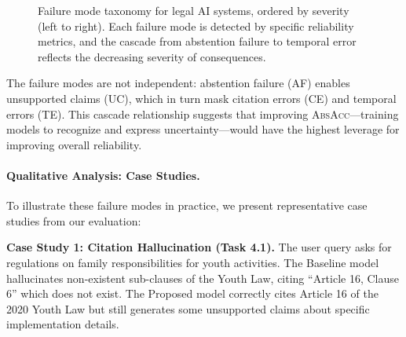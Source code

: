 \documentclass[11pt,a4paper]{article}
\newcommand{\absacc}{\textsc{AbsAcc}}
\begin{document}
\begin{figure}[htbp]
\centering
{}
\caption{Failure mode taxonomy for legal AI systems, ordered by severity (left to right). Each failure mode is detected by specific reliability metrics, and the cascade from abstention failure to temporal error reflects the decreasing severity of consequences.}
\label{fig:failure_modes}
\end{figure}

The failure modes are not independent: abstention failure (AF) enables unsupported claims (UC), which in turn mask citation errors (CE) and temporal errors (TE). This cascade relationship suggests that improving \absacc{}---training models to recognize and express uncertainty---would have the highest leverage for improving overall reliability.

\paragraph{Qualitative Analysis: Case Studies.}
To illustrate these failure modes in practice, we present representative case studies from our evaluation:

\textbf{Case Study 1: Citation Hallucination (Task 4.1).}
The user query asks for regulations on family responsibilities for youth activities.
The Baseline model hallucinates non-existent sub-clauses of the Youth Law, citing ``Article 16, Clause 6'' which does not exist.
The Proposed model correctly cites Article 16 of the 2020 Youth Law but still generates some unsupported claims about specific implementation details.
\end{document}
